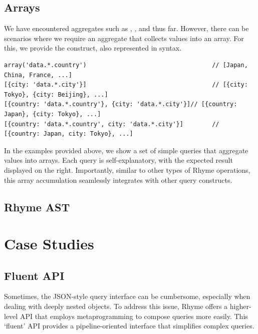 \documentclass[runningheads]{llncs}
\newcommand{\lang}{Rhyme}
\begin{document}
\subsection{Arrays}
We have encountered aggregates such as , , and 
thus far.
However, there can be scenarios where we require an aggregate that collects values
into an array.
For this, we provide the  construct, also represented in \inline{[]} syntax.

\begin{lstlisting}[style=JavaScript, columns=flexible]
array('data.*.country')                                   // [Japan, China, France, ...]
[{city: 'data.*.city'}]                                   // [{city: Tokyo}, {city: Beijing}, ...]
[{country: 'data.*.country'}, {city: 'data.*.city'}]// [{country: Japan}, {city: Tokyo}, ...]
[{country: 'data.*.country', city: 'data.*.city'}]        // [{country: Japan, city: Tokyo}, ...]
\end{lstlisting}

In the examples provided above, we show a set of simple queries that aggregate values
into arrays.
Each query is self-explanatory, with the expected result displayed on the right.
Importantly, similar to other types of \lang{} operations, this array accumulation
seamlessly integrates with other query constructs.

\subsection{\lang{} AST}\label{subsec:ast}


\section{Case Studies}
\subsection{Fluent API}\label{subsec:fluent}
Sometimes, the JSON-style query interface can be cumbersome,
especially when dealing with deeply nested objects.
To address this issue, \lang{} offers a higher-level API that employs
metaprogramming to compose queries more easily.
This `fluent' API provides a pipeline-oriented interface that
simplifies complex queries.
\end{document}
